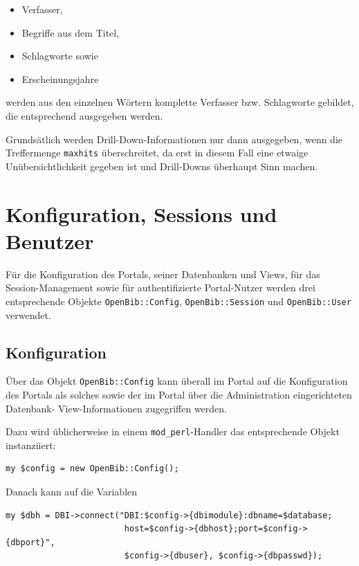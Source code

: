 \documentclass[11pt, twoside, a4paper, BCOR8mm, DIV12, bibtotoc,idxtotoc]{scrbook}
\begin{document}
\begin{itemize}
\item Verfasser,
\item Begriffe aus dem Titel,
\item Schlagworte sowie
\item Erscheinungsjahre
\end{itemize}

werden aus den einzelnen Wörtern komplette Verfasser bzw. Schlagworte
gebildet, die entsprechend ausgegeben werden.

Grundsätlich werden Drill-Down-Informationen nur dann ausgegeben, wenn
die Treffermenge \texttt{maxhits} überschreitet, da erst in diesem
Fall eine etwaige Unübersichtlichkeit gegeben ist und Drill-Downs
überhaupt Sinn machen.


\section{Konfiguration, Sessions und Benutzer}

Für die Konfiguration des Portals, seiner Datenbanken und Views, für
das Session-Management sowie für authentifizierte Portal-Nutzer werden
drei entsprechende Objekte \texttt{OpenBib::Config},
\texttt{OpenBib::Session} und \texttt{OpenBib::User} verwendet.

\subsection{Konfiguration}

Über das Objekt \texttt{OpenBib::Config} kann überall im Portal auf
die Konfiguration des Portals als solches sowie der im Portal über die
Administration eingerichteten Datenbank- View-Informationen
zugegriffen werden.

Dazu wird üblicherweise in einem \texttt{mod\_perl}-Handler das
entsprechende Objekt instanziiert:

\begin{verbatim}
my $config = new OpenBib::Config();
\end{verbatim}

Danach kann auf die Variablen  

\begin{verbatim}
my $dbh = DBI->connect("DBI:$config->{dbimodule}:dbname=$database;
                        host=$config->{dbhost};port=$config->{dbport}",
                        $config->{dbuser}, $config->{dbpasswd});
\end{verbatim}
\end{document}
